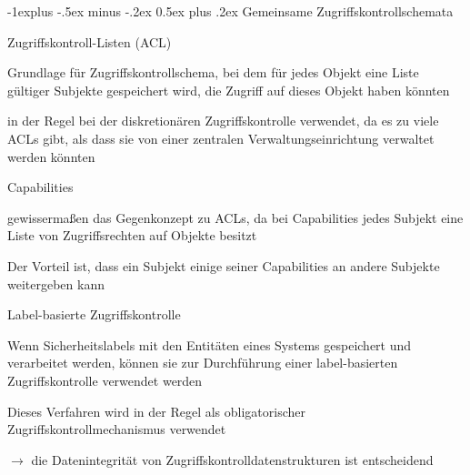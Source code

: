 \documentclass[a4paper]{article}
\makeatletter
\renewcommand{\subsection}{\@startsection{subsection}{2}{0mm}%
 {-1explus -.5ex minus -.2ex}%
 {0.5ex plus .2ex}%
 {\normalfont\normalsize\bfseries}}
\makeatother
\begin{document}
\begin{multicols}{3}

      \subsection{Gemeinsame Zugriffskontrollschemata}
      \begin{itemize*}
            \item Zugriffskontroll-Listen (ACL)
            \begin{itemize*}
                  \item Grundlage für Zugriffskontrollschema, bei dem für jedes Objekt eine Liste gültiger Subjekte gespeichert wird, die Zugriff auf dieses Objekt haben könnten %
                  \item in der Regel bei der diskretionären Zugriffskontrolle verwendet, da es zu viele ACLs gibt, als dass sie von einer zentralen Verwaltungseinrichtung verwaltet werden könnten
            \end{itemize*}
            \item Capabilities
            \begin{itemize*}
                  \item gewissermaßen das Gegenkonzept zu ACLs, da bei Capabilities jedes Subjekt eine Liste von Zugriffsrechten auf Objekte besitzt
                  \item Der Vorteil ist, dass ein Subjekt einige seiner Capabilities an andere Subjekte weitergeben kann
            \end{itemize*}
            \item Label-basierte Zugriffskontrolle
            \begin{itemize*}
                  \item Wenn Sicherheitslabels mit den Entitäten eines Systems gespeichert und verarbeitet werden, können sie zur Durchführung einer label-basierten Zugriffskontrolle verwendet werden
                  \item Dieses Verfahren wird in der Regel als obligatorischer Zugriffskontrollmechanismus verwendet
            \end{itemize*}
            \item[$\rightarrow$] die Datenintegrität von Zugriffskontrolldatenstrukturen ist entscheidend
      \end{itemize*}
      \columnbreak


\end{multicols}
\end{document}
